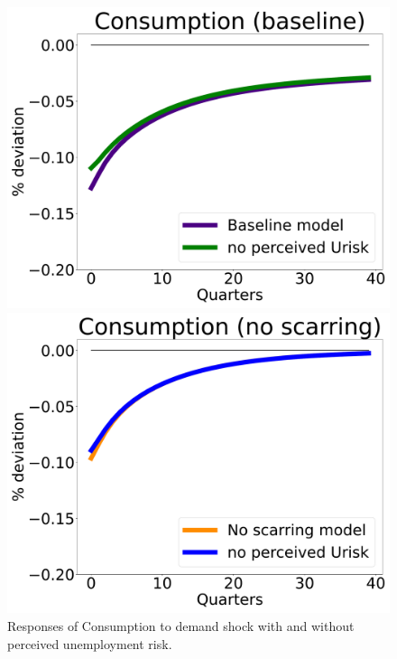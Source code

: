\begin{figure}[H]
    \centering
   \begin{minipage}{0.47\textwidth}
        \centering
        \includegraphics[scale=.2]{text/chapter1/Figures/Urisk/C_IPR_urisk_base_flex_wage} %
    \end{minipage}\hfill
    \begin{minipage}{0.47\textwidth}
        \centering
        \includegraphics[scale=.2]{text/chapter1/Figures/Urisk/C_IPR_urisk_base_no_scar_flex_wage} %
    \end{minipage}
    \caption{Responses of Consumption to demand shock with and without perceived unemployment risk.}
    \label{Urisk_base}
\end{figure}




